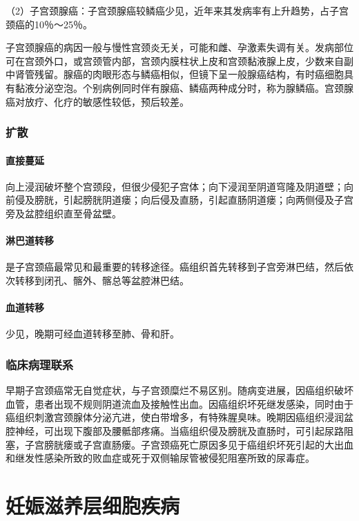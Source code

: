（2）子宫颈腺癌：子宫颈腺癌较鳞癌少见，近年来其发病率有上升趋势，占子宫颈癌的10％～25％。

子宫颈腺癌的病因一般与慢性宫颈炎无关，可能和雌、孕激素失调有关。发病部位可在宫颈外口，或宫颈管内部，宫颈内膜柱状上皮和宫颈黏液腺上皮，少数来自副中肾管残留。腺癌的肉眼形态与鳞癌相似，但镜下呈一般腺癌结构，有时癌细胞具有黏液分泌空泡。个别病例同时伴有腺癌、鳞癌两种成分时，称为腺鳞癌。宫颈腺癌对放疗、化疗的敏感性较低，预后较差。

\subsubsection{扩散}

\paragraph{直接蔓延}
向上浸润破坏整个宫颈段，但很少侵犯子宫体；向下浸润至阴道穹隆及阴道壁；向前侵及膀胱，引起膀胱阴道瘘；向后侵及直肠，引起直肠阴道瘘；向两侧侵及子宫旁及盆腔组织直至骨盆壁。

\paragraph{淋巴道转移}
是子宫颈癌最常见和最重要的转移途径。癌组织首先转移到子宫旁淋巴结，然后依次转移到闭孔、髂外、髂总等盆腔淋巴结。

\paragraph{血道转移}
少见，晚期可经血道转移至肺、骨和肝。

\subsubsection{临床病理联系}

早期子宫颈癌常无自觉症状，与子宫颈糜烂不易区别。随病变进展，因癌组织破坏血管，患者出现不规则阴道流血及接触性出血。因癌组织坏死继发感染，同时由于癌组织刺激宫颈腺体分泌亢进，使白带增多，有特殊腥臭味。晚期因癌组织浸润盆腔神经，可出现下腹部及腰骶部疼痛。当癌组织侵及膀胱及直肠时，可引起尿路阻塞，子宫膀胱瘘或子宫直肠瘘。子宫颈癌死亡原因多见于癌组织坏死引起的大出血和继发性感染所致的败血症或死于双侧输尿管被侵犯阻塞所致的尿毒症。

\section{妊娠滋养层细胞疾病}

